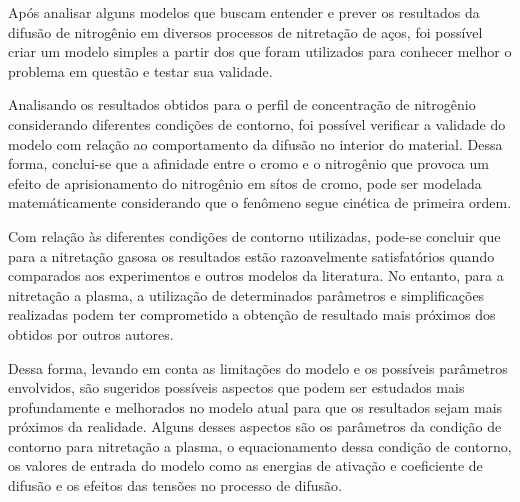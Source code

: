 Após analisar alguns modelos que buscam entender e prever os resultados da difusão de nitrogênio em diversos processos de nitretação de aços, foi possível criar um modelo simples a partir dos que foram utilizados para conhecer melhor o problema em questão e testar sua validade.

Analisando os resultados obtidos para o perfil de concentração de nitrogênio considerando diferentes condições de contorno, foi possível verificar a validade do modelo com relação ao comportamento da difusão no interior do material. Dessa forma, conclui-se que a afinidade entre o cromo e o nitrogênio que provoca um efeito de aprisionamento do nitrogênio em sítos de cromo, pode ser modelada matemáticamente considerando que o fenômeno segue cinética de primeira ordem.

Com relação às diferentes condições de contorno utilizadas, pode-se concluir que para a nitretação gasosa os resultados estão razoavelmente satisfatórios quando comparados aos experimentos e outros modelos da literatura. No entanto, para a nitretação a plasma, a utilização de determinados parâmetros e simplificações realizadas podem ter comprometido a obtenção de resultado mais próximos dos obtidos por outros autores. 

Dessa forma, levando em conta as limitações do modelo e os possíveis parâmetros envolvidos, são sugeridos possíveis aspectos que podem ser estudados mais profundamente e melhorados no modelo atual para que os resultados sejam mais próximos da realidade. Alguns desses aspectos são os parâmetros da condição de contorno para nitretação a plasma, o equacionamento dessa condição de contorno, os valores de entrada do modelo como as energias de ativação e coeficiente de difusão e os efeitos das tensões no processo de difusão.
